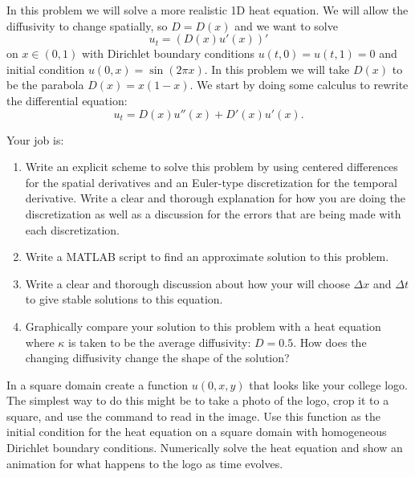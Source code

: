 \begin{problem}
    In this problem we will solve a more realistic 1D heat equation.  We will allow the
    diffusivity to change spatially, so $D = D(x)$ and we want to solve
    \[ u_t = \left( D(x) u'(x) \right)' \]
    on $x \in (0,1)$ with Dirichlet boundary conditions $u(t,0) = u(t,1) = 0$ and initial
    condition $u(0,x) = \sin(2 \pi x)$. In this problem we will take $D(x)$ to be the
    parabola $D(x)= x(1-x)$. We start by doing some calculus to rewrite the
    differential equation:
    \[ u_t = D(x) u''(x) + D'(x) u'(x). \]

    Your job is:
    \begin{enumerate}
        \item Write an explicit scheme to solve this problem by using centered differences
            for the spatial derivatives and an Euler-type discretization for the temporal
            derivative.  Write a clear and thorough explanation for how you are doing the
            discretization as well as a discussion for the errors that are being made with
            each discretization.
        \item Write a MATLAB script to find an approximate solution to this problem.
        \item Write a clear and thorough discussion about how your will choose $\Delta x$
            and $\Delta t$ to give stable solutions to this equation.
        \item Graphically compare your solution to this problem with a heat equation where
            $\kappa$ is taken to be the average diffusivity: $D = 0.5.$  How does the
            changing diffusivity change the shape of the solution?
    \end{enumerate}

\end{problem}

\begin{problem}
    In a square domain create a function $u(0,x,y)$ that looks like your college logo.
    The simplest way to do this might be to take a photo of the logo, crop it to a square,
    and use the  command to read in the image.  Use this function as the
    initial condition for the heat equation on a square domain with homogeneous Dirichlet
    boundary conditions.  Numerically solve the heat equation and show an animation for
    what happens to the logo as time evolves.
\end{problem}

